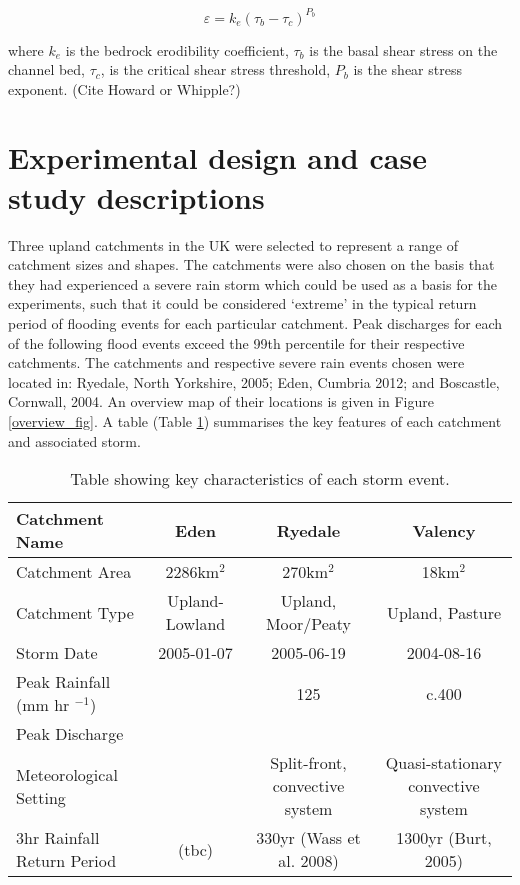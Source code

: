 \documentclass[12pt,oneside,PhD]{muthesis}
\begin{document}
\begin{equation}
\varepsilon = k_e(\tau_b - \tau_c)^{P_b}
\end{equation}

where \(k_e\) is the bedrock erodibility coefficient, \(\tau_b\) is the basal shear stress on the channel bed, \(\tau_c\), is the critical shear stress threshold, \(P_b\) is the shear stress exponent. (Cite Howard or Whipple?)

\section{Experimental design and case study descriptions}
Three upland catchments in the UK were selected to represent a range of catchment sizes and shapes. The catchments were also chosen on the basis that they had experienced a severe rain storm which could be used as a basis for the experiments, such that it could be considered `extreme' in the typical return period of flooding events for each particular catchment. Peak discharges for each of the following flood events exceed the 99th percentile for their respective catchments. The catchments and respective severe rain events chosen were located in: Ryedale, North Yorkshire, 2005; Eden, Cumbria 2012; and Boscastle, Cornwall, 2004. An overview map of their locations is given in Figure \ref{overview_fig}. A table (Table \ref{met_setting}) summarises the key features of each catchment and associated storm.

\linespread{1.3}
\begin{table}
\resizebox{\textwidth}{!}
{%
\begin{tabular}{l c c c} \hline

Catchment Name& \textbf{Eden} 			& \textbf{Ryedale} &  \textbf{Valency} \\ \hline
Catchment Area & 2286km$^2$ 			& 270km$^2$ 				& 18km$^2$ \\ 
Catchment Type & Upland-Lowland & Upland, Moor/Peaty & Upland, Pasture \\ 
Storm Date	 		&  2005-01-07	 & 2005-06-19 	& 2004-08-16 \\ 
Peak Rainfall	 (mm hr \(^{-1}\)) & & 125  & c.400 \\
Peak Discharge	 	& & & \\ 
Meteorological Setting	& 	& Split-front, convective system & Quasi-stationary convective system \\ 
3hr Rainfall Return Period 		& (tbc)	 & 330yr (Wass et al. 2008)	& 1300yr (Burt, 2005) \\ \hline
\end{tabular}
}
\caption{Table showing key characteristics of each storm event.}
\label{met_setting}
\end{table}
\end{document}
